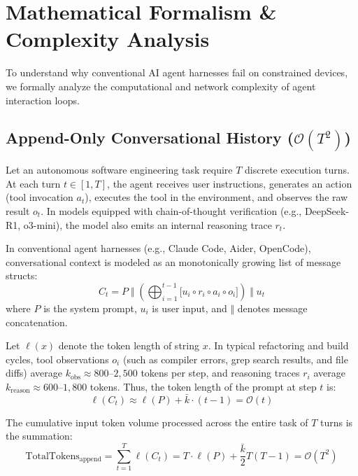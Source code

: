 \section{Mathematical Formalism \& Complexity Analysis}
\label{sec:formalism}

To understand why conventional AI agent harnesses fail on constrained devices, we formally analyze the computational and network complexity of agent interaction loops.

\subsection{Append-Only Conversational History ($\mathcal{O}(T^2)$)}
Let an autonomous software engineering task require $T$ discrete execution turns. At each turn $t \in [1, T]$, the agent receives user instructions, generates an action (tool invocation $a_t$), executes the tool in the environment, and observes the raw result $o_t$. In models equipped with chain-of-thought verification (e.g., DeepSeek-R1, o3-mini), the model also emits an internal reasoning trace $r_t$.

In conventional agent harnesses (e.g., Claude Code, Aider, OpenCode), conversational context is modeled as an monotonically growing list of message structs:
\begin{equation}
C_t = P \;\Vert\; \left( \bigoplus_{i=1}^{t-1} \Big[ u_i \circ r_i \circ a_i \circ o_i \Big] \right) \;\Vert\; u_t
\end{equation}
where $P$ is the system prompt, $u_i$ is user input, and $\Vert$ denotes message concatenation.

Let $\ell(x)$ denote the token length of string $x$. In typical refactoring and build cycles, tool observations $o_i$ (such as compiler errors, grep search results, and file diffs) average $k_{\text{obs}} \approx 800\text{--}2,500$ tokens per step, and reasoning traces $r_i$ average $k_{\text{reason}} \approx 600\text{--}1,800$ tokens. Thus, the token length of the prompt at step $t$ is:
\begin{equation}
\ell(C_t) \approx \ell(P) + \bar{k} \cdot (t - 1) = \mathcal{O}(t)
\end{equation}

The cumulative input token volume processed across the entire task of $T$ turns is the summation:
\begin{equation}
\label{eq:append_cost}
\text{TotalTokens}_{\text{append}} = \sum_{t=1}^T \ell(C_t) = T \cdot \ell(P) + \frac{\bar{k}}{2} T(T - 1) = \mathcal{O}(T^2)
\end{equation}

